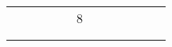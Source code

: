 \documentclass[12pt]{article}
\begin{document}
\begin{table}[]
{\begin{tabular}{clllllllllllllllllllllllllllllll}
\multicolumn{2}{|c|}{\cellcolor[HTML]{96FFFB}}                    & \multicolumn{2}{l|}{\cellcolor[HTML]{96FFFB}}                    & \multicolumn{5}{l|}{\cellcolor[HTML]{FFCC67}}                                                                         & \multicolumn{1}{l|}{} & \multicolumn{10}{l|}{\multirow{-7}{*}{\cellcolor[HTML]{FFFE65}8}}                                                                                                                                                                             & \multicolumn{1}{l|}{} & \multicolumn{1}{l|}{} & \multicolumn{1}{l|}{} & \multicolumn{1}{l|}{} & \multicolumn{1}{l|}{} & \multicolumn{7}{l|}{\cellcolor[HTML]{67FD9A}}                                                                                                                          \\ \cline{10-25}
\multicolumn{2}{|c|}{\cellcolor[HTML]{96FFFB}}                    & \multicolumn{2}{l|}{\multirow{-2}{*}{\cellcolor[HTML]{96FFFB}}}  & \multicolumn{5}{l|}{\cellcolor[HTML]{FFCC67}}                                                                         & \multicolumn{16}{l|}{\cellcolor[HTML]{9698ED}}                                                                                                                                                                                                                                                                                                                                                & \multicolumn{7}{l|}{\cellcolor[HTML]{67FD9A}}                                                                                                                          \\ \cline{3-4}
\multicolumn{2}{|c|}{\cellcolor[HTML]{96FFFB}}                    & \multicolumn{1}{l|}{}           & \multicolumn{1}{l|}{}          & \multicolumn{5}{l|}{\cellcolor[HTML]{FFCC67}}                                                                         & \multicolumn{16}{l|}{\cellcolor[HTML]{9698ED}}                                                                                                                                                                                                                                                                                                                                                & \multicolumn{7}{l|}{\cellcolor[HTML]{67FD9A}}                                                                                                                          \\ \cline{3-4}

\end{tabular}}
\end{table}
\end{document}
